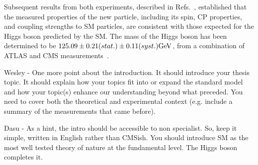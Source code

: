 Subsequent results from both experiments, described in
Refs.~\cite{Aad:2015gba, Khachatryan:2014jba, Chatrchyan:2012jja, Aad:2013xqa, Khachatryan:2014kca,Sirunyan:2017exp},
established that the measured properties of the new particle,
including its spin, CP properties,
and coupling strengths to SM particles, are consistent with those expected for the Higgs boson predicted by the SM.
The mass of the Higgs boson has been determined to be
$125.09\pm0.21(stat.)\pm0.11(syst.)\mathrm{GeV}$, from a combination of
ATLAS and CMS measurements~\cite{Aad:2015zhl}.










Wesley -
One more point about the introduction. It should introduce your thesis topic.
It should explain how your topics fit into or expand the standard model and
how your topic(s) enhance our understanding beyond what preceded. You
need to cover both the theoretical and experimental context (e.g. include
a summary of the measurements that came before).

Dasu - 
As a hint, the intro should be accessible to non specialist. So, keep it simple, written in English rather than CMSish. You should introduce SM as the most well tested theory of nature at the fundamental level. The Higgs boson completes it.



